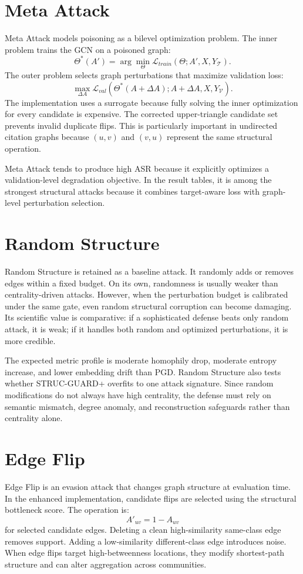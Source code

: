 \documentclass[12pt,oneside]{report}
\begin{document}
\section{Meta Attack}
Meta Attack models poisoning as a bilevel optimization problem. The inner problem trains the GCN on a poisoned graph:
$$
\Theta^*(A')=\arg\min_{\Theta}\mathcal{L}_{train}(\Theta;A',X,Y_{\mathcal{T}}).
$$
The outer problem selects graph perturbations that maximize validation loss:
$$
\max_{\Delta A}\mathcal{L}_{val}(\Theta^*(A+\Delta A);A+\Delta A,X,Y_{\mathcal{V}}).
$$
The implementation uses a surrogate because fully solving the inner optimization for every candidate is expensive. The corrected upper-triangle candidate set prevents invalid duplicate flips. This is particularly important in undirected citation graphs because $(u,v)$ and $(v,u)$ represent the same structural operation.

Meta Attack tends to produce high ASR because it explicitly optimizes a validation-level degradation objective. In the result tables, it is among the strongest structural attacks because it combines target-aware loss with graph-level perturbation selection.

\section{Random Structure}
Random Structure is retained as a baseline attack. It randomly adds or removes edges within a fixed budget. On its own, randomness is usually weaker than centrality-driven attacks. However, when the perturbation budget is calibrated under the same gate, even random structural corruption can become damaging. Its scientific value is comparative: if a sophisticated defense beats only random attack, it is weak; if it handles both random and optimized perturbations, it is more credible.

The expected metric profile is moderate homophily drop, moderate entropy increase, and lower embedding drift than PGD. Random Structure also tests whether STRUC-GUARD+ overfits to one attack signature. Since random modifications do not always have high centrality, the defense must rely on semantic mismatch, degree anomaly, and reconstruction safeguards rather than centrality alone.

\section{Edge Flip}
Edge Flip is an evasion attack that changes graph structure at evaluation time. In the enhanced implementation, candidate flips are selected using the structural bottleneck score. The operation is:
$$
A'_{uv}=1-A_{uv}
$$
for selected candidate edges. Deleting a clean high-similarity same-class edge removes support. Adding a low-similarity different-class edge introduces noise. When edge flips target high-betweenness locations, they modify shortest-path structure and can alter aggregation across communities.
\end{document}
